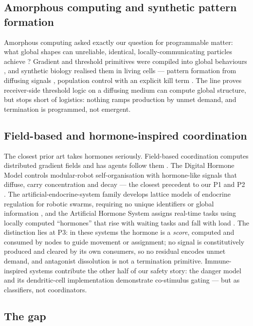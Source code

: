 \documentclass[twoside,twocolumn,usenatbib]{mnras}
\begin{document}
\subsection{Amorphous computing and synthetic pattern formation}

Amorphous computing asked exactly our question for programmable matter:
what global shapes can unreliable, identical, locally-communicating
particles achieve \citep{abelson2000}? Gradient and threshold
primitives were compiled into global behaviours \citep{nagpal2003}, and
synthetic biology realised them in living cells --- pattern formation
from diffusing signals \citep{basu2005}, population control with an
explicit kill term \citep{you2004}. The line proves receiver-side
threshold logic on a diffusing medium can compute global structure, but
stops short of logistics: nothing ramps production by unmet demand, and
termination is programmed, not emergent.

\subsection{Field-based and hormone-inspired coordination}

The closest prior art takes hormones seriously. Field-based
coordination computes distributed gradient fields and has agents follow
them \citep{mamei2006}. The Digital Hormone Model controls
modular-robot self-organisation with hormone-like signals that diffuse,
carry concentration and decay --- the closest precedent to our P1 and
P2 \citep{shen2004}. The artificial-endocrine-system family develops
lattice models of endocrine regulation for robotic swarms, requiring no
unique identifiers or global information \citep{xu2011}, and the
Artificial Hormone System assigns real-time tasks using locally
computed ``hormones'' that rise with waiting tasks and fall with load
\citep{brinkschulte2008}. The distinction lies at P3: in these systems
the hormone is a \emph{score}, computed and consumed by nodes to guide
movement or assignment; no signal is constitutively produced and
cleared by its own consumers, so no residual encodes unmet demand, and
antagonist dissolution is not a termination primitive. Immune-inspired
systems contribute the other half of our safety story: the danger model
\citep{matzinger1994, matzinger2002} and its dendritic-cell
implementation \citep{greensmith2005} demonstrate co-stimulus gating
--- but as classifiers, not coordinators.

\subsection{The gap}
\end{document}
